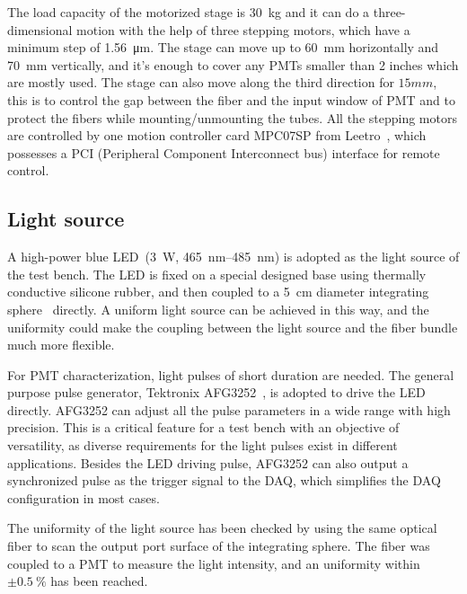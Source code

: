 \documentclass{JINST}
\begin{document}
The load capacity of the motorized stage is \SI{30}{\kilo\gram} and it can do a three-dimensional motion with the help of three stepping motors, which have a minimum step of \SI{1.56}{\micro\meter}.
The stage can move up to \SI{60}{\milli\meter} horizontally and \SI{70}{\milli\meter} vertically, and it's enough to cover any PMTs smaller than 2 inches which are mostly used.
The stage can also move along the third direction for $15mm$, this is to control the gap between the fiber and the input window of PMT and to protect the fibers while mounting/unmounting the tubes.
All the stepping motors are controlled by one motion controller card MPC07SP from Leetro~\cite{leetro}, which possesses a PCI (Peripheral Component Interconnect bus) interface for remote control.
	
\subsection{Light source}
\label{sec:light_source}
	
A high-power blue LED~\cite{z-light}(\SI{3}{\watt},  \SIrange{465}{485}{\nano\meter}) is adopted as the light source of the test bench.
The LED is fixed on a special designed base using thermally conductive silicone rubber, and then coupled to a  \SI{5}{\centi\meter} diameter integrating sphere~\cite{integrating_sphere} directly.
A uniform light source can be achieved in this way, and the uniformity could make the coupling between the light source and the fiber bundle much more flexible.
	
For PMT characterization, light pulses of short duration are needed.
The general purpose pulse generator, Tektronix AFG3252~\cite{afg3252}, is adopted to drive the LED directly.
AFG3252 can adjust all the pulse parameters in a wide range with high precision. This is a critical feature for a test bench with an objective of versatility, as diverse requirements for the light pulses exist in different applications. 
Besides the LED driving pulse, AFG3252 can also output a synchronized pulse as the trigger signal to the DAQ, which  simplifies the DAQ configuration in most cases. 
	
The uniformity of the light source has been checked by using the same optical fiber to scan the output port surface of the integrating sphere. The fiber was coupled to a PMT to measure the light intensity, and an uniformity within $\pm\SI{0.5}{\percent}$ has been reached.
\end{document}
